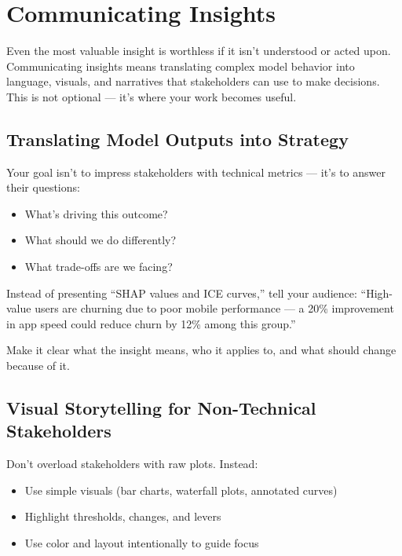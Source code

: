 \documentclass[12pt,openany]{book}
\begin{document}
\chapter{Communicating Insights}

Even the most valuable insight is worthless if it isn’t understood or acted upon. Communicating insights means translating complex model behavior into language, visuals, and narratives that stakeholders can use to make decisions. This is not optional — it’s where your work becomes useful.



\section{Translating Model Outputs into Strategy}

Your goal isn’t to impress stakeholders with technical metrics — it’s to answer their questions:
\begin{itemize}
  \item What’s driving this outcome?
  \item What should we do differently?
  \item What trade-offs are we facing?
\end{itemize}

\begin{examplebox}
Instead of presenting “SHAP values and ICE curves,” tell your audience: “High-value users are churning due to poor mobile performance — a 20\% improvement in app speed could reduce churn by 12\% among this group.”
\end{examplebox}

Make it clear what the insight means, who it applies to, and what should change because of it.



\section{Visual Storytelling for Non-Technical Stakeholders}

Don’t overload stakeholders with raw plots. Instead:
\begin{itemize}
  \item Use simple visuals (bar charts, waterfall plots, annotated curves)
  \item Highlight thresholds, changes, and levers
  \item Use color and layout intentionally to guide focus
\end{itemize}
\end{document}
